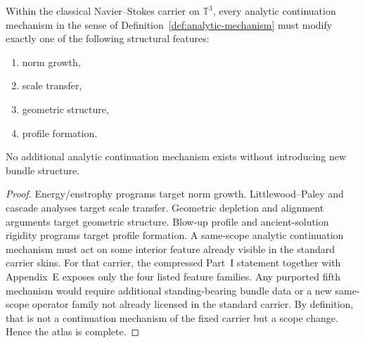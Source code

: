 \begin{theorem}
\label{thm:atlas-closure}
Within the classical Navier--Stokes carrier on $\mathbb T^3$, every analytic continuation mechanism in
the sense of Definition~\ref{def:analytic-mechanism} must modify exactly one of the following
structural features:
\begin{enumerate}[label=(\roman*), leftmargin=2.2em]
\item norm growth,
\item scale transfer,
\item geometric structure,
\item profile formation.
\end{enumerate}
No additional analytic continuation mechanism exists without introducing new bundle structure.
\end{theorem}

\begin{proof}
Energy/enstrophy programs target norm growth.
Littlewood--Paley and cascade analyses target scale transfer.
Geometric depletion and alignment arguments target geometric structure.
Blow-up profile and ancient-solution rigidity programs target profile formation.
A same-scope analytic continuation mechanism must act on some interior feature already visible in the
standard carrier skins. For that carrier, the compressed Part~I statement together with Appendix~E exposes only the four listed feature
families. Any purported fifth mechanism would require additional standing-bearing bundle data or a new
same-scope operator family not already licensed in the standard carrier. By definition, that is not a
continuation mechanism of the fixed carrier but a scope change. Hence the atlas is complete.
\end{proof}
\newpage
